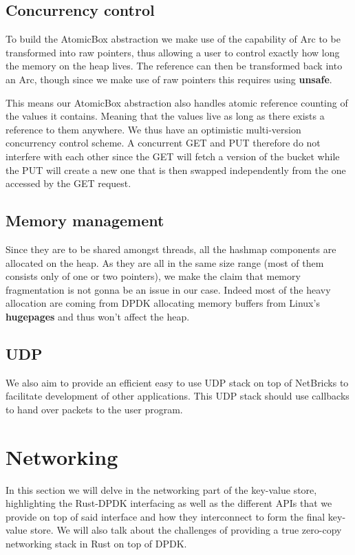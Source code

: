 \documentclass[11pt]{article}
\begin{document}
\subsection{Concurrency control}
To build the AtomicBox abstraction we make use of the capability of
Arc to be transformed into raw pointers, thus allowing a user to
control exactly how long the memory on the heap lives. The reference
can then be transformed back into an Arc, though since we make use of
raw pointers this requires using \textbf{unsafe}.

This means our AtomicBox abstraction also handles atomic reference
counting of the values it contains. Meaning that the values live as
long as there exists a reference to them anywhere. We thus have an
optimistic multi-version concurrency control scheme. A concurrent GET
and PUT therefore do not interfere with each other since the GET will
fetch a version of the bucket while the PUT will create a new one that
is then swapped independently from the one accessed by the GET
request.

\subsection{Memory management}
Since they are to be shared amongst threads, all the hashmap
components are allocated on the heap. As they are  all in the same
size range (most of them consists only of one or two pointers), we
make the claim that memory fragmentation is not gonna be an issue in
our case. Indeed most of the heavy allocation are coming from DPDK
allocating memory buffers from Linux's \textbf{hugepages} and thus
won't affect the heap.

\subsection{UDP}

We also aim to provide an efficient easy to use UDP stack on top of
NetBricks to facilitate development of other applications. This UDP
stack should use callbacks to hand over packets to the user program.

\section{Networking}

In this section we will delve in the networking part of the key-value
store, highlighting the Rust-DPDK interfacing as well as the different
APIs that we provide on top of said interface and how they
interconnect to form the final key-value store. We will also talk
about the challenges of providing a true zero-copy networking stack in
Rust on top of DPDK.
\end{document}

